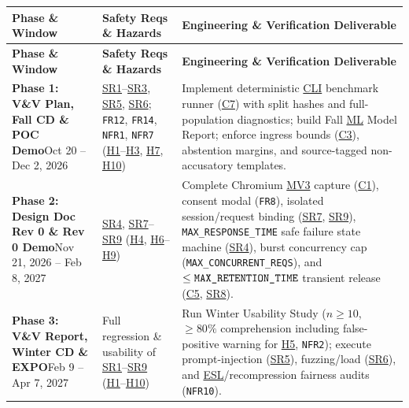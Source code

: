 \documentclass[11pt]{article}
\newcommand{\MaxResponseTime}{\texttt{MAX\_\allowbreak{}RESPONSE\_\allowbreak{}TIME}}
\newcommand{\MaxRetentionTime}{\texttt{MAX\_\allowbreak{}RETENTION\_\allowbreak{}TIME}}
\newcommand{\MaxConcurrentReqs}{\texttt{MAX\_\allowbreak{}CONCURRENT\_\allowbreak{}REQS}}
\newcommand{\CLI}{\hyperlink{ha-acr-cli}{CLI}}
\newcommand{\ESL}{\hyperlink{ha-acr-esl}{ESL}}
\newcommand{\ML}{\hyperlink{ha-acr-ml}{ML}}
\newcommand{\MVThree}{\hyperlink{ha-acr-mv3}{MV3}}
\begin{document}
{\small
\renewcommand{\arraystretch}{1.05}
\begin{tabularx}{\textwidth}{P{3.4cm} P{3.2cm} Y}
\caption{Capstone Implementation and Verification Roadmap} \label{TblHARoadmap}\\
\toprule
\textbf{Phase \& Window} & \textbf{Safety Reqs \& Hazards} & \textbf{Engineering \& Verification Deliverable}\\
\midrule
\endfirsthead
\toprule
\textbf{Phase \& Window} & \textbf{Safety Reqs \& Hazards} & \textbf{Engineering \& Verification Deliverable}\\
\midrule
\endhead
\bottomrule
\endfoot
\textbf{Phase 1: V\&V Plan, Fall CD \& POC Demo}\newline Oct 20 -- Dec 2, 2026 &
\hyperref[SR1]{SR1}--\hyperref[SR3]{SR3}, \hyperref[SR5]{SR5}, \hyperref[SR6]{SR6}; \texttt{FR12}, \texttt{FR14}, \texttt{NFR1}, \texttt{NFR7} (\hyperref[haz:H1]{H1}--\hyperref[haz:H3]{H3}, \hyperref[haz:H7]{H7}, \hyperref[haz:H10]{H10}) &
Implement deterministic \CLI{} benchmark runner (\hyperref[comp:C7]{C7}) with split hashes and full-population diagnostics; build Fall \ML{} Model Report; enforce ingress bounds (\hyperref[comp:C3]{C3}), abstention margins, and source-tagged non-accusatory templates.\\
\midrule
\textbf{Phase 2: Design Doc Rev 0 \& Rev 0 Demo}\newline Nov 21, 2026 -- Feb 8, 2027 &
\hyperref[SR4]{SR4}, \hyperref[SR7]{SR7}--\hyperref[SR9]{SR9} (\hyperref[haz:H4]{H4}, \hyperref[haz:H6]{H6}--\hyperref[haz:H9]{H9}) &
Complete Chromium \MVThree{} capture (\hyperref[comp:C1]{C1}), consent modal (\texttt{FR8}), isolated session/request binding (\hyperref[SR7]{SR7}, \hyperref[SR9]{SR9}), \MaxResponseTime{} safe failure state machine (\hyperref[SR4]{SR4}), burst concurrency cap (\MaxConcurrentReqs{}), and $\le \MaxRetentionTime{}$ transient release (\hyperref[comp:C5]{C5}, \hyperref[SR8]{SR8}).\\
\midrule
\textbf{Phase 3: V\&V Report, Winter CD \& EXPO}\newline Feb 9 -- Apr 7, 2027 &
Full regression \& usability of \hyperref[SR1]{SR1}--\hyperref[SR9]{SR9} (\hyperref[haz:H1]{H1}--\hyperref[haz:H10]{H10}) &
Run Winter Usability Study ($n \ge 10$, $\ge 80\%$ comprehension including false-positive warning for \hyperref[haz:H5]{H5}, \texttt{NFR2}); execute prompt-injection (\hyperref[SR5]{SR5}), fuzzing/load (\hyperref[SR6]{SR6}), and \ESL{}/recompression fairness audits (\texttt{NFR10}).\\
\end{tabularx}
}
\end{document}
